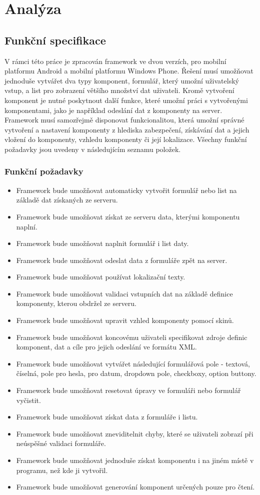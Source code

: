 \chapter{Analýza}
\section{Funkční specifikace}
V rámci této práce je zpracován framework ve dvou verzích, pro mobilní platformu Android a mobilní platformu Windows Phone. Řešení musí umožňovat jednoduše vytvářet dva typy komponent, formulář, který umožní uživatelský vstup, a list pro zobrazení většího množství dat uživateli. Kromě vytvoření komponent je nutné poskytnout další funkce, které umožní práci s vytvořenými komponentami, jako je například odeslání dat z komponenty na server. Framework musí samozřejmě disponovat funkcionalitou, která umožní správné vytvoření a nastavení komponenty z hlediska zabezpečení, získávání dat a jejich vložení do komponenty, vzhledu komponenty či její lokalizace. Všechny funkční požadavky jsou uvedeny v následujícím seznamu položek.
\subsection{Funkční požadavky}
\begin{itemize}
\item Framework bude umožňovat automaticky vytvořit formulář nebo list na základě dat získaných ze serveru.
\item Framework bude umožňovat získat ze serveru data, kterými komponentu naplní.
\item Framework bude umožňovat naplnit formulář i list daty.
\item Framework bude umožňovat odeslat data z formuláře zpět na server.
\item Framework bude umožňovat používat lokalizační texty.
\item Framework bude umožňovat validaci vstupních dat na základě definice komponenty, kterou obdržel ze serveru.
\item Framework bude umožňovat upravit vzhled komponenty pomocí skinů.
\item Framework bude umožňovat koncovému uživateli specifikovat zdroje definic komponent, dat a cíle pro jejich odeslání ve formátu XML.
\item Framework bude umožňovat vytvářet následující formulářová pole - textová, číselná, pole pro hesla, pro datum, dropdown pole, checkboxy, option buttony.
\item Framework bude umožňovat resetovat úpravy ve formuláři nebo formulář vyčistit.
\item Framework bude umožňovat získat data z formuláře i listu.
\item Framework bude umožňovat zneviditelnit chyby, které se uživateli zobrazí při neúspěšné validaci formuláře.
\item Framework bude umožňovat jednoduše získat komponentu i na jiném místě v programu, než kde ji vytvořil.
\item Framework bude umožňovat generování komponent určených pouze pro čtení.
\end{itemize}

